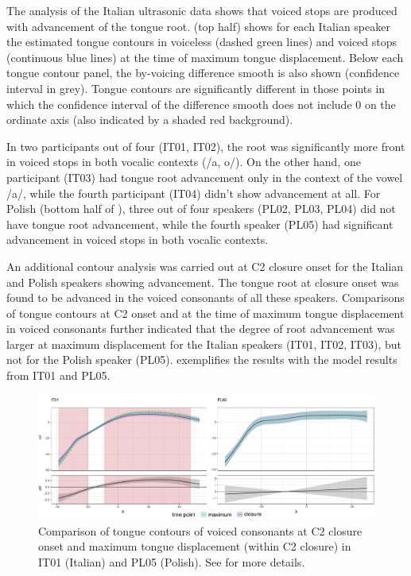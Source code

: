 \documentclass[authoryear, twocolumn]{elsarticle}
\begin{document}
The analysis of the Italian ultrasonic data shows that voiced stops are
produced with advancement of the tongue root.  (top half)
shows for each Italian speaker the estimated tongue contours in
voiceless (dashed green lines) and voiced stops (continuous blue lines)
at the time of maximum tongue displacement. Below each tongue contour
panel, the by-voicing difference smooth is also shown (confidence
interval in grey). Tongue contours are significantly different in those
points in which the confidence interval of the difference smooth does
not include 0 on the ordinate axis (also indicated by a shaded red
background).

In two participants out of four (IT01, IT02), the root was significantly
more front in voiced stops in both vocalic contexts (/a, o/). On the
other hand, one participant (IT03) had tongue root advancement only in
the context of the vowel /a/, while the fourth participant (IT04) didn't
show advancement at all. For Polish (bottom half of ), three
out of four speakers (PL02, PL03, PL04) did not have tongue root
advancement, while the fourth speaker (PL05) had significant advancement
in voiced stops in both vocalic contexts.

An additional contour analysis was carried out at C2 closure onset for
the Italian and Polish speakers showing advancement. The tongue root at
closure onset was found to be advanced in the voiced consonants of all
these speakers. Comparisons of tongue contours at C2 onset and at the
time of maximum tongue displacement in voiced consonants further
indicated that the degree of root advancement was larger at maximum
displacement for the Italian speakers (IT01, IT02, IT03), but not for
the Polish speaker (PL05).  exemplifies the results with
the model results from IT01 and PL05.

\begin{figure}
    \centering
    \includegraphics[width=.9\textwidth]{fig/voiced-colour.pdf}
    \caption{Comparison of tongue contours of voiced consonants at C2 closure onset and maximum tongue displacement (within C2 closure) in IT01 (Italian) and PL05 (Polish). See  for more details.}
    \label{f:voiced}
\end{figure}
\end{document}
